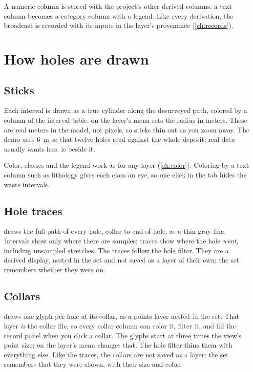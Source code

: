 A numeric column is stored with the project's other derived columns; a text column becomes a category column with a legend. Like every derivation, the broadcast is recorded with its inputs in the layer's provenance (\cref{ch:records}).

\section{How holes are drawn}\label{sec:dh-display}

\subsection{Sticks}

Each interval is drawn as a true cylinder along the desurveyed path, colored by a column of the interval table.  on the layer's menu sets the radius in meters. These are real meters in the model, not pixels, so sticks thin out as you zoom away. The demo uses 6~m so that twelve holes read against the whole deposit; real data usually wants less.  is beside it.

Color, classes and the legend work as for any layer (\cref{ch:color}). Coloring by a text column such as lithology gives each class an eye, so one click in the  tab hides the waste intervals.

\subsection{Hole traces}

 draws the full path of every hole, collar to end of hole, as a thin gray line. Intervals show only where there are samples; traces show where the hole \emph{went}, including unsampled stretches. The traces follow the hole filter. They are a derived display, nested in the set and not saved as a layer of their own; the set remembers whether they were on.

\subsection{Collars}

 draws one glyph per hole at its collar, as a points layer nested in the set. That layer \emph{is} the collar file, so every collar column can color it, filter it, and fill the record panel when you click a collar. The glyphs start at three times the view's point size;  on the layer's menu changes that. The hole filter thins them with everything else. Like the traces, the collars are not saved as a layer: the set remembers that they were shown, with their size and color.

